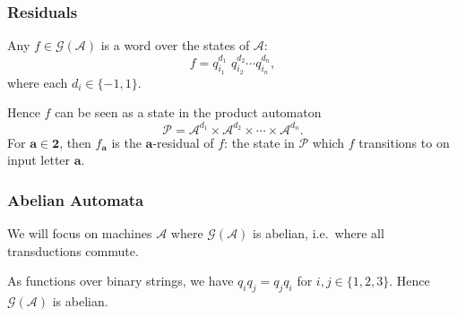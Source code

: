 \documentclass{beamer}
\newcommand{\ch}[1]{\mathbf{#1}}
\newcommand{\A}{\mathcal{A}}
\newcommand{\gp}{\mathcal{G}}
\newcommand{\res}[2]{{{#1}_{\ch{#2}}}}
\newcommand{\bin}{\pmb{\bm{2}}}
\begin{document}
\begin{frame}
    \frametitle{Residuals}
    Any $f \in \gp(\A)$ is a word over the states of $\A$:
    \[
        f = q_{i_1}^{d_1} \,\, q_{i_2}^{d_2}  \cdots q_{i_n}^{d_n},
    \]
    where each $d_i \in \{-1, 1\}$.
    \pause

    Hence $f$ can be seen as a state in the product automaton
    \[
        \mathcal P = \A^{d_1} \times \A^{d_2} \times \cdots \times \A^{d_n}.
    \]
    \pause
    For $\ch{a} \in \bin$, then $\res{f}{a}$ is the \alert{$\ch{a}$-residual}
    of $f$: the state in $\mathcal P$ which $f$ transitions to on input
    letter $\ch{a}$.
    \begin{center}
    \end{center}
\end{frame}

\begin{frame}
    \frametitle{Abelian Automata}
    We will focus on machines $\A$ where $\gp(\A)$ is abelian, i.e.\ where
    all transductions commute.
    \pause
    \begin{center}
        \usebox{\ccc}
    \end{center}
    \pause
    As functions over binary strings, we have $q_i q_j = q_j q_i$ for $i,j \in
    \{1, 2, 3\}$. Hence $\gp(\A)$ is abelian.
\end{frame}
\end{document}
